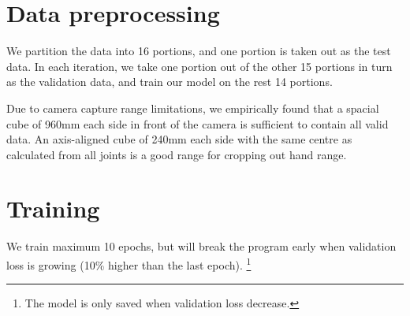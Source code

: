 \documentclass{article}
\begin{document}
\section{Data preprocessing}
We partition the data into 16 portions, and one portion is taken out as the test data. In each iteration, we take one portion out of the other 15 portions in turn as the validation data, and train our model on the rest 14 portions.

Due to camera capture range limitations, we empirically found that a spacial cube of 960mm each side in front of the camera is sufficient to contain all valid data. An axis-aligned cube of 240mm each side with the same centre as calculated from all joints is a good range for cropping out hand range.

\section{Training}
We train maximum 10 epochs, but will break the program early when validation loss is growing (10\% higher than the last epoch). \footnote{The model is only saved when validation loss decrease.}
\end{document}
